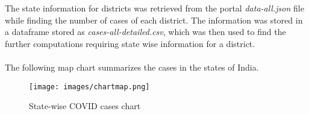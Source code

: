 \documentclass{article}
\begin{document}
The state information for districts was retrieved from the portal \emph{data-all.json} file while finding the number of cases of each district. The information was stored in a dataframe stored as \emph{cases-all-detailed.csv}, which was then used to find the further computations requiring state wise information for a district. \\ \\
The following map chart summarizes the cases in the states of India. \\

\begin{figure}
  \texttt{[image: images/chartmap.png]}
  \caption{State-wise COVID cases chart}
\end{figure}
\end{document}
